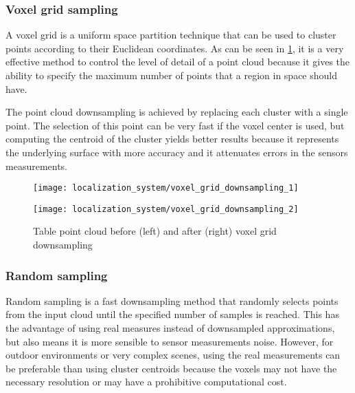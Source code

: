 \subsubsection{Voxel grid sampling}

A voxel grid is a uniform space partition technique that can be used to cluster points according to their Euclidean coordinates. As can be seen in \cref{fig:point-cloud-algorithms_voxel-grid-downsampling}, it is a very effective method to control the level of detail of a point cloud because it gives the ability to specify the maximum number of points that a region in space should have.

The point cloud downsampling is achieved by replacing each cluster with a single point. The selection of this point can be very fast if the voxel center is used, but computing the centroid of the cluster yields better results because it represents the underlying surface with more accuracy and it attenuates errors in the sensors measurements.


\begin{figure}[H]
	\centering
	\begin{minipage}[h]{0.495\textwidth}
		\centering
			\texttt{[image: localization\_system/voxel\_grid\_downsampling\_1]}
	\end{minipage}\hfill
	\begin{minipage}[h]{.495\textwidth}
		\centering
	\texttt{[image: localization\_system/voxel\_grid\_downsampling\_2]}
	\end{minipage}
	\caption[Table point cloud before (left) and after (right) voxel grid downsampling]{Table point cloud before (left) and after (right) voxel grid downsampling\protect\footnotemark}
	\label{fig:point-cloud-algorithms_voxel-grid-downsampling}
\end{figure}



\subsubsection{Random sampling}

Random sampling \cite{Vitter1984} is a fast downsampling method that randomly selects points from the input cloud until the specified number of samples is reached. This has the advantage of using real measures instead of downsampled approximations, but also means it is more sensible to sensor measurements noise. However, for outdoor environments or very complex scenes, using the real measurements can be preferable than using cluster centroids because the voxels may not have the necessary resolution or may have a prohibitive computational cost.


